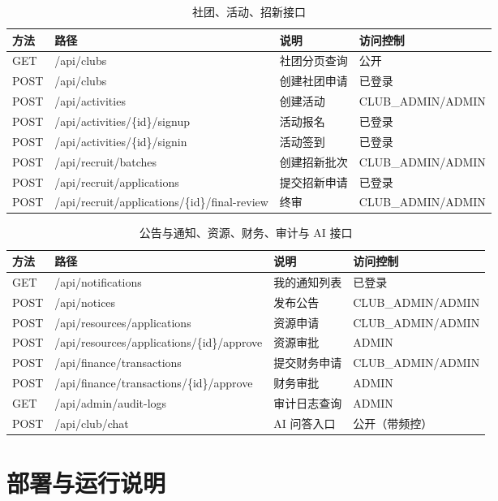 \begin{table}[H]
\centering
\caption{社团、活动、招新接口}
\begin{tabular}{llll}
\toprule
方法 & 路径 & 说明 & 访问控制 \\
\midrule
GET & /api/clubs & 社团分页查询 & 公开 \\
POST & /api/clubs & 创建社团申请 & 已登录 \\
POST & /api/activities & 创建活动 & CLUB\_ADMIN/ADMIN \\
POST & /api/activities/\{id\}/signup & 活动报名 & 已登录 \\
POST & /api/activities/\{id\}/signin & 活动签到 & 已登录 \\
POST & /api/recruit/batches & 创建招新批次 & CLUB\_ADMIN/ADMIN \\
POST & /api/recruit/applications & 提交招新申请 & 已登录 \\
POST & /api/recruit/applications/\{id\}/final-review & 终审 & CLUB\_ADMIN/ADMIN \\
\bottomrule
\end{tabular}
\end{table}

\begin{table}[H]
\centering
\caption{公告与通知、资源、财务、审计与 AI 接口}
\begin{tabular}{llll}
\toprule
方法 & 路径 & 说明 & 访问控制 \\
\midrule
GET & /api/notifications & 我的通知列表 & 已登录 \\
POST & /api/notices & 发布公告 & CLUB\_ADMIN/ADMIN \\
POST & /api/resources/applications & 资源申请 & CLUB\_ADMIN/ADMIN \\
POST & /api/resources/applications/\{id\}/approve & 资源审批 & ADMIN \\
POST & /api/finance/transactions & 提交财务申请 & CLUB\_ADMIN/ADMIN \\
POST & /api/finance/transactions/\{id\}/approve & 财务审批 & ADMIN \\
GET & /api/admin/audit-logs & 审计日志查询 & ADMIN \\
POST & /api/club/chat & AI 问答入口 & 公开（带频控） \\
\bottomrule
\end{tabular}
\end{table}

\chapter{部署与运行说明}

